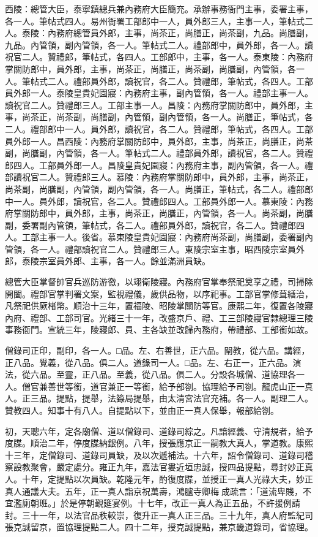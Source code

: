\begin{pinyinscope}
西陵：總管大臣，泰寧鎮總兵兼內務府大臣簡充。承辦事務衙門主事，委署主事，各一人。筆帖式四人。易州衙署工部郎中一人，員外郎三人，主事一人，筆帖式二人。泰陵：內務府總管員外郎，主事，尚茶正，尚膳正，尚茶副，九品。尚膳副，九品。內管領，副內管領，各一人。筆帖式二人。禮部郎中，員外郎，各一人。讀祝官二人。贊禮郎，筆帖式，各四人。工部郎中，主事，各一人。泰東陵：內務府掌關防郎中，員外郎，主事，尚茶正，尚膳正，尚茶副，尚膳副，內管領，各一人。筆帖式二人。禮部員外郎，讀祝官，各二人。贊禮郎，筆帖式，各四人。工部員外郎一人。泰陵皇貴妃園寢：內務府主事，副內管領，各一人。禮部主事一人。讀祝官二人。贊禮郎三人。工部主事一人。昌陵：內務府掌關防郎中，員外郎，主事，尚茶正，尚茶副，尚膳副，內管領，副內管領，各一人。尚膳正，筆帖式，各二人。禮部郎中一人。員外郎，讀祝官，各二人。贊禮郎，筆帖式，各四人。工部員外郎一人。昌西陵：內務府掌關防郎中，員外郎，主事，尚茶正，尚膳正，尚茶副，尚膳副，內管領，各一人。筆帖式二人。禮部員外郎，讀祝官，各二人。贊禮郎四人。工部員外郎一人。昌陵皇貴妃園寢：內務府主事，副內管領，各一人。禮部讀祝官二人。贊禮郎三人。慕陵：內務府掌關防郎中，員外郎，主事，尚茶正，尚茶副，尚膳副，內管領，副內管領，各一人。尚膳正，筆帖式，各二人。禮部郎中一人。員外郎，讀祝官，各二人。贊禮郎四人。工部員外郎一人。慕東陵：內務府掌關防郎中，員外郎，主事，尚茶正，尚膳正，內管領，各一人。尚茶副，尚膳副，委署副內管領，筆帖式，各二人。禮部員外郎，讀祝官，各二人。贊禮郎四人。工部主事一人。後省。慕東陵皇貴妃園寢：內務府尚茶副，尚膳副，委署副內管領，各一人。禮部讀祝官二人。贊禮郎三人。東陵宗室主事，昭西陵宗室員外郎，泰陵宗室員外郎、主事，各一人。餘並滿洲員缺。

總管大臣掌督帥官兵巡防游徼，以翊衛陵寢。內務府官掌奉祭祀奠享之禮，司掃除開闔。禮部官掌判署文案，監視禮儀，歲供品物，以序祀事。工部官掌修葺繕治，凡祭祀供厥楮幣。順治十三年，置福陵、昭陵掌關防等官。康熙二年，復置各陵寢內府、禮部、工部司官。光緒三十一年，改盛京戶、禮、工三部陵寢官隸總理三陵事務衙門。宣統三年，陵寢郎、員、主各缺並改歸內務府，帶禮部、工部銜如故。

僧錄司正印，副印，各一人。□品。左、右善世，正六品。闡教，從六品。講經，正八品。覺義，從八品。俱二人。道錄司一人。□品。左、右正一，正六品。演法，從六品。至靈，正八品。至義，從八品。俱二人。分設各城僧、道協理各一人。僧官兼善世等銜，道官兼正一等銜，給予部劄。協理給予司劄。龍虎山正一真人。正三品。提點，提舉，法籙局提舉，由太清宮法官充補。各一人。副理二人。贊教四人。知事十有八人。自提點以下，並由正一真人保舉，報部給劄。

初，天聰六年，定各廟僧、道以僧錄司、道錄司綜之。凡諳經義、守清規者，給予度牒。順治二年，停度牒納銀例。八年，授張應京正一嗣教大真人，掌道教。康熙十三年，定僧錄司、道錄司員缺，及以次遞補法。十六年，詔令僧錄司、道錄司稽察設教聚會，嚴定處分。雍正九年，嘉法官婁近垣忠誠，授四品提點，尋封妙正真人。十年，定提點以次員缺。乾隆元年，酌復度牒，並授正一真人光祿大夫，妙正真人通議大夫。五年，正一真人詣京祝萬壽，鴻臚寺卿梅成疏言：「道流卑賤，不宜濫廁朝班。」於是停朝覲筵宴例。十七年，改正一真人為正五品，不許援例請封。三十一年，以法官品秩較崇，復升正一真人正三品。三十九年，真人府監紀司張克誠留京，置協理提點二人。四十二年，授克誠提點，兼京畿道錄司，省協理。


\end{pinyinscope}